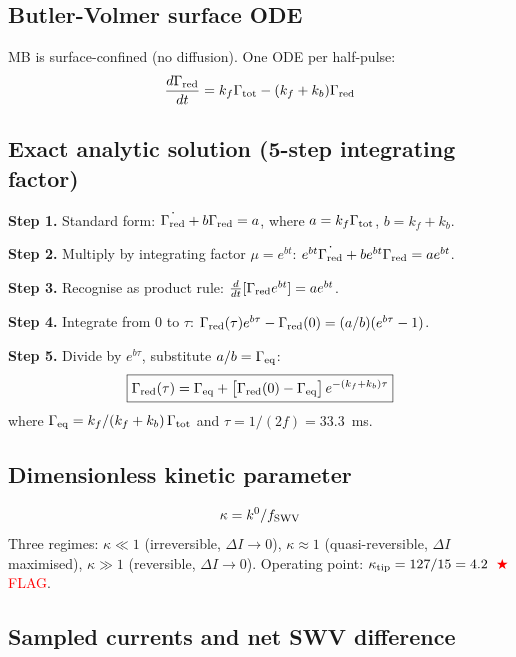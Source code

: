 \documentclass[10pt,a4paper]{article}
\numberwithin{equation}{section}
\newcommand{\FLAG}{\textcolor{red}{$\bigstar$\,FLAG}}
\newcommand{\DI}{\Delta I}
\newcommand{\Grtot}{\Gamma_{\rm tot}}
\newcommand{\Grred}{\Gamma_{\rm red}}
\newcommand{\Greq}{\Gamma_{\rm eq}}
\newcommand{\kzero}{k^0}
\begin{document}
\subsection{Butler-Volmer surface ODE}

MB is surface-confined (no diffusion). One ODE per half-pulse:
\begin{equation}
  \frac{d\Grred}{dt}
  = k_f\Grtot - (k_f+k_b)\Grred
\end{equation}

\subsection{Exact analytic solution (5-step integrating factor)}

\textbf{Step 1.} Standard form: $\dot{\Grred} + b\Grred = a$, where
$a = k_f\Grtot$, $b = k_f+k_b$.

\textbf{Step 2.} Multiply by integrating factor $\mu = e^{bt}$:
$e^{bt}\dot{\Grred} + be^{bt}\Grred = ae^{bt}$.

\textbf{Step 3.} Recognise as product rule: $\tfrac{d}{dt}[\Grred e^{bt}] = ae^{bt}$.

\textbf{Step 4.} Integrate from 0 to $\tau$:
$\Grred(\tau)e^{b\tau} - \Grred(0) = (a/b)(e^{b\tau}-1)$.

\textbf{Step 5.} Divide by $e^{b\tau}$, substitute $a/b = \Greq$:
\begin{equation}
  \boxed{
  \Grred(\tau) = \Greq + \bigl[\Grred(0)-\Greq\bigr]\,e^{-(k_f+k_b)\tau}
  }
\end{equation}
where $\Greq = k_f/(k_f+k_b)\,\Grtot$ and $\tau = 1/(2f) = 33.3$~ms.

\subsection{Dimensionless kinetic parameter}

\begin{equation}
  \kappa = \kzero/f_{\rm SWV}
\end{equation}
Three regimes: $\kappa\ll1$ (irreversible, $\DI\to0$), $\kappa\approx1$ (quasi-reversible, $\DI$ maximised), $\kappa\gg1$ (reversible, $\DI\to0$). Operating point: $\kappa_{\rm tip} = 127/15 = 4.2$~\FLAG.

\subsection{Sampled currents and net SWV difference}
\end{document}
